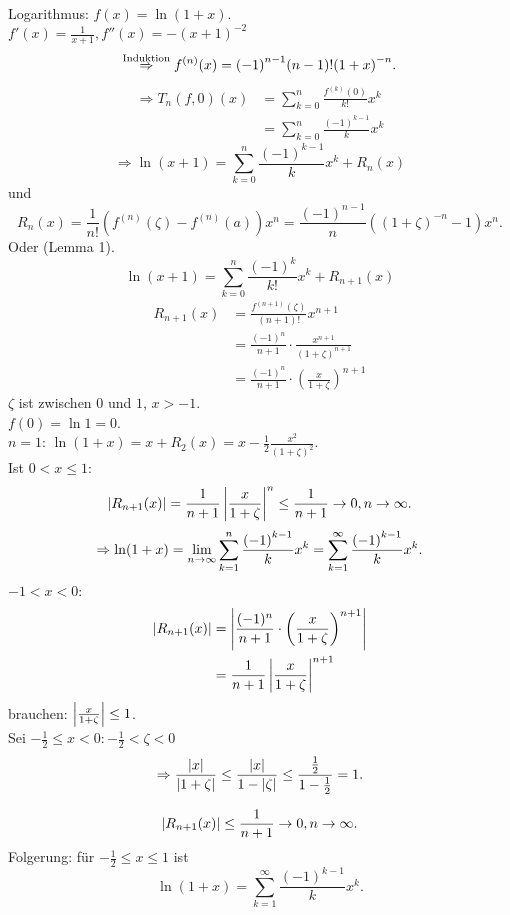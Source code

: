 \documentclass[../ana2.tex]{subfiles}
\begin{document}
\begin{bsp}
    Logarithmus: \( f(x) = \ln(1+x) \). \\
    \( f'(x) = \frac{1}{x+1}, f''(x) = -(x+1)^{-2} \)
    \[ \overset{\text{Induktion}}{\Rightarrow} f^{(n)}(x) 
    = {(-1)}^{n-1} (n-1)! {(1+x)}^{-n}. \]
    \begin{align*}
        \Rightarrow T_n(f,0)(x) &= \sum_{k=0}^{n} \frac{f^{(k)}(0)}{k!}x^k \\
        &= \sum_{k=0}^n \frac{{(-1)}^{k-1}}{k} x^k
    \end{align*}
    \[ \Rightarrow \ln(x+1) = \sum_{k=0}^n 
    \frac{ {(-1)}^{k-1} }{k} x^k + R_n(x) \]
    und 
    \[ R_n(x) = \frac{1}{n!} 
    \left(
        f^{(n)}(\zeta) - f^{(n)}(a)
    \right) x^n = \frac{{(-1)}^{n-1}}{n} 
    \left( (1 + \zeta)^{-n} - 1 \right) x^n. \]
    Oder (Lemma 1).
    \[ \ln(x+1) = \sum_{k=0}^{n} \frac{(-1)^k}{k!} x^k
    + R_{n+1}(x) \]   
    \begin{align*}
        R_{n+1}(x) &= \frac{f^{(n+1)}(\zeta)}{(n+1)!} x^{n+1} \\
        &= \frac{(-1)^n}{n+1} \cdot \frac{x^{n+1}}{(1+ \zeta)^{n+1}} \\
        &= \frac{(-1)^n}{n+1} 
        \cdot \left( \frac{x}{1+ \zeta} \right)^{n+1}
    \end{align*} 
    \( \zeta \) ist zwischen \(0\) und \(1\), \( x > -1 \).\\
    \( f(0) = \ln 1 = 0 \).\\
    \( n = 1 \): \( \ln(1+x) = x + R_2(x) 
    = x - \frac{1}{2} \frac{x^2}{(1+\zeta)^2} \).\\
    Ist \( 0 < x \leq 1 \): 
    \[ \left| R_{n+1}(x) \right| = \frac{1}{n+1} 
    \left|\frac{x}{1+\zeta}\right|^n \leq \frac{1}{n+1} \rightarrow 0, 
    n\rightarrow \infty. \]
    \[ \Rightarrow \ln(1+x) = \lim\limits_{n\rightarrow\infty} \sum_{k=1}^n 
    \frac{ {(-1)}^{k-1} }{ k } x^k 
    = \sum_{k=1}^\infty \frac{ {(-1)}^{k-1} }{k} x^k. \]
    \( -1 < x < 0 \):
    \begin{align*}
        \left| R_{n+1}(x) \right|
        &= \left| \frac{(-1)^n}{n+1} \cdot 
        \left( \frac{x}{1+\zeta} \right)^{n+1} \right| \\
        &= \frac{1}{n+1} \left|\frac{x}{1+\zeta}\right|^{n+1} 
    \end{align*}
    brauchen: \( \left|\frac{x}{1+\zeta}\right| \leq 1 \). \\
    Sei \( -\frac{1}{2} \leq x < 0: -\frac{1}{2} < \zeta < 0 \)    
    \[ \Rightarrow \frac{\left|x\right|}{\left|1+\zeta\right|} \leq \frac{\left|x\right|}{1-\left|\zeta\right|}
      \leq \frac{\frac{1}{2}}{1 - \frac{1}{2}} = 1. \]

    \[ \left| R_{n+1}(x) \right| \leq \frac{1}{n+1} 
    \rightarrow 0, n \rightarrow \infty. \]
    Folgerung: für \( -\frac{1}{2} \leq x \leq 1 \) ist 
    \[ \ln(1+x) = \sum_{k=1}^\infty 
    \frac{ {(-1)}^{k-1} }{k} x^k. \]
\end{bsp}
\end{document}
